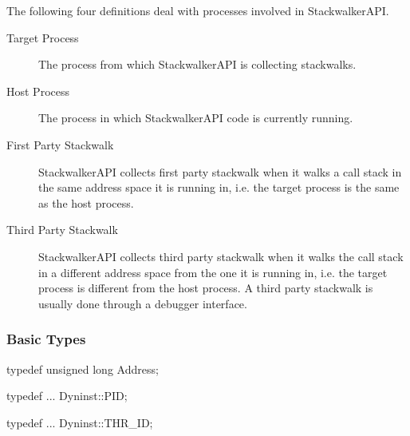 The following four definitions deal with processes involved in StackwalkerAPI.
\begin{description}

\item [Target Process] The process from which StackwalkerAPI is collecting
    stackwalks.

\item [Host Process] The process in which StackwalkerAPI code is currently
    running.

\item [First Party Stackwalk] StackwalkerAPI collects first party stackwalk when
    it walks a call stack in the same address space it is running in, i.e. the
    target process is the same as the host process.

\item [Third Party Stackwalk] StackwalkerAPI collects third party stackwalk when
    it walks the call stack in a different address space from the one it is
    running in, i.e. the target process is different from the host process. A
    third party stackwalk is usually done through a debugger interface.

\end{description}

\subsubsection{Basic Types}

\begin{apient}
typedef unsigned long Address;
\end{apient}
\begin{apient}
typedef ... Dyninst::PID;
\end{apient}
\begin{apient}
typedef ... Dyninst::THR_ID;
\end{apient}

